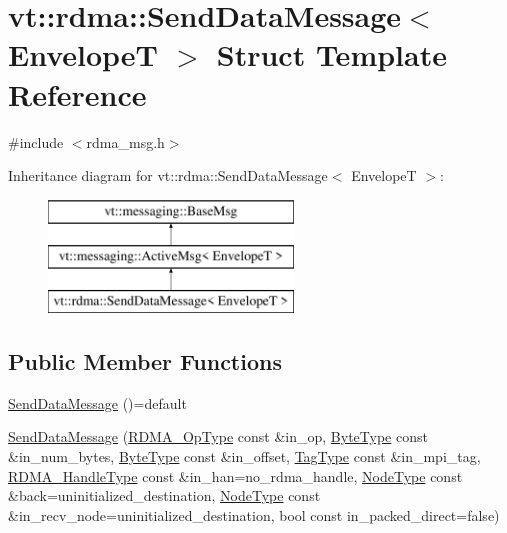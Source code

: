 \hypertarget{structvt_1_1rdma_1_1_send_data_message}{}\section{vt\+:\+:rdma\+:\+:Send\+Data\+Message$<$ EnvelopeT $>$ Struct Template Reference}
\label{structvt_1_1rdma_1_1_send_data_message}


{\ttfamily \#include $<$rdma\+\_\+msg.\+h$>$}

Inheritance diagram for vt\+:\+:rdma\+:\+:Send\+Data\+Message$<$ EnvelopeT $>$\+:\begin{figure}[H]
\begin{center}
\leavevmode
\includegraphics[height=3.000000cm]{structvt_1_1rdma_1_1_send_data_message}
\end{center}
\end{figure}
\subsection*{Public Member Functions}
\begin{DoxyCompactItemize}
\item 
\hyperlink{structvt_1_1rdma_1_1_send_data_message_a0846cf3d3d74c48714b679dc5e42a379}{Send\+Data\+Message} ()=default
\item 
\hyperlink{structvt_1_1rdma_1_1_send_data_message_aa40145bdda8af458d6202927a5a72255}{Send\+Data\+Message} (\hyperlink{namespacevt_1_1rdma_a9b966d9780a2b41afe7cd7b7b4b20300}{R\+D\+M\+A\+\_\+\+Op\+Type} const \&in\+\_\+op, \hyperlink{namespacevt_aab8d55968084610ce3b17057981e9300}{Byte\+Type} const \&in\+\_\+num\+\_\+bytes, \hyperlink{namespacevt_aab8d55968084610ce3b17057981e9300}{Byte\+Type} const \&in\+\_\+offset, \hyperlink{namespacevt_a84ab281dae04a52a4b243d6bf62d0e52}{Tag\+Type} const \&in\+\_\+mpi\+\_\+tag, \hyperlink{namespacevt_a10442579ec4e7ebef223818e64bcf908}{R\+D\+M\+A\+\_\+\+Handle\+Type} const \&in\+\_\+han=no\+\_\+rdma\+\_\+handle, \hyperlink{namespacevt_a866da9d0efc19c0a1ce79e9e492f47e2}{Node\+Type} const \&back=uninitialized\+\_\+destination, \hyperlink{namespacevt_a866da9d0efc19c0a1ce79e9e492f47e2}{Node\+Type} const \&in\+\_\+recv\+\_\+node=uninitialized\+\_\+destination, bool const in\+\_\+packed\+\_\+direct=false)
\end{DoxyCompactItemize}
